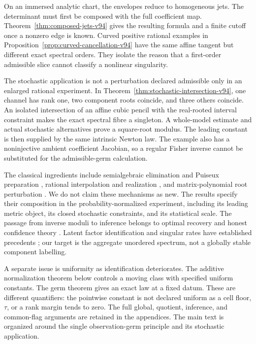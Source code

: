 \documentclass[11pt,reqno]{amsart}
\numberwithin{equation}{section}
\theoremstyle{definition}\newtheorem{definition}[theorem]{Definition}
\theoremstyle{remark}\newtheorem{remark}[theorem]{Remark}
\begin{document}
On an immersed analytic chart, the envelopes reduce to homogeneous
jets. The determinant must first be composed with the full coefficient
map. Theorem~\ref{thm:composed-jets-v94} gives the resulting formula
and a finite cutoff once a nonzero edge is known. Curved positive
rational examples in Proposition~\ref{prop:curved-cancellation-v94}
have the same affine tangent but different exact spectral orders.
They isolate the reason that a first-order admissible slice cannot
classify a nonlinear singularity.

The stochastic application is not a perturbation declared admissible
only in an enlarged rational experiment. In
Theorem~\ref{thm:stochastic-intersection-v94}, one channel has rank
one, two component roots coincide, and three others coincide. An
isolated intersection of an affine cubic pencil with the real-rooted
interval constraint makes the exact spectral fibre a singleton. A
whole-model estimate and actual stochastic alternatives prove a
square-root modulus. The leading constant is then supplied by the
same intrinsic Newton law. The example also has a noninjective
ambient coefficient Jacobian, so a regular Fisher inverse cannot be
substituted for the admissible-germ calculation.

The classical ingredients include semialgebraic elimination and
Puiseux preparation \cite{BCR98,BPR06}, rational interpolation and
realization \cite{VBB,AA90,BL00,MA07}, and matrix-polynomial root
perturbation \cite{GLR82,MBO97,TH,KPM09}. We do not claim these
mechanisms as new. The results specify their composition in the
probability-normalized experiment, including its leading metric
object, its closed stochastic constraints, and its statistical scale.
The passage from inverse moduli to inference belongs to optimal
recovery and honest confidence theory \cite{Donoho,CaiLow,Dufour}.
Latent factor identification and singular rates have established
precedents \cite{AMR,BJR,BCV,LLB,HN}; our target is the aggregate
unordered spectrum, not a globally stable component labelling.

A separate issue is uniformity as identification deteriorates. The
additive normalization theorem below controls a moving class with
specified uniform constants. The germ theorem gives an exact law at
a fixed datum. These are different quantifiers: the pointwise
constant is not declared uniform as a cell floor, $\tau$, or a rank
margin tends to zero. The full global, quotient, inference, and
common-flag arguments are retained in the appendices. The main text
is organized around the single observation-germ principle and its
stochastic application.
\end{document}
